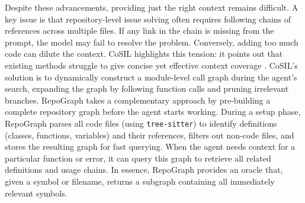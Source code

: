 Despite these advancements, providing just the right context remains difficult. A key issue is that repository-level issue solving often requires following chains of references across multiple files. If any link in the chain is missing from the prompt, the model may fail to resolve the problem. Conversely, adding too much code can dilute the context. CoSIL \cite{jiang2025cosilsoftwareissuelocalization}  highlights this tension: it points out that existing methods struggle to give concise yet effective context coverage . CoSIL’s solution is to dynamically construct a module-level call graph during the agent’s search, expanding the graph by following function calls and pruning irrelevant branches. RepoGraph takes a complementary approach by pre-building a complete repository graph before the agent starts working. During a setup phase, RepoGraph parses all code files (using \texttt{tree-sitter}) to identify definitions (classes, functions, variables) and their references, filters out non-code files, and stores the resulting graph for fast querying. When the agent needs context for a particular function or error, it can query this graph to retrieve all related definitions and usage chains. In essence, RepoGraph provides an oracle that, given a symbol or filename, returns a subgraph containing all immediately relevant symbols.
